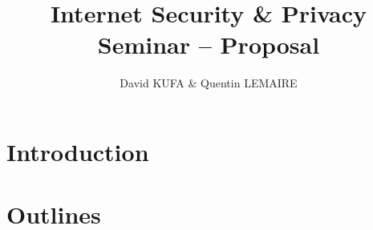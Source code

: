 \documentclass[a4paper,11pt]{article}
\title{Internet Security \& Privacy\\Seminar -- Proposal}
\author{David KUFA \& Quentin LEMAIRE}
\begin{document}
  \maketitle %

  \begin{abstract}
  \end{abstract}


  \section{Introduction}


  \section{Outlines}
  
\end{document}
